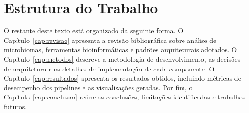 \section{Estrutura do Trabalho}

O restante deste texto está organizado da seguinte forma. O
Capítulo~\ref{cap:revisao} apresenta a revisão bibliográfica sobre
análise de microbiomas, ferramentas bioinformáticas e padrões
arquiteturais adotados. O Capítulo~\ref{cap:metodos} descreve a
metodologia de desenvolvimento, as decisões de arquitetura e os
detalhes de implementação de cada componente. O
Capítulo~\ref{cap:resultados} apresenta os resultados obtidos,
incluindo métricas de desempenho dos pipelines e as visualizações
geradas. Por fim, o Capítulo~\ref{cap:conclusao} reúne as conclusões,
limitações identificadas e trabalhos futuros.
